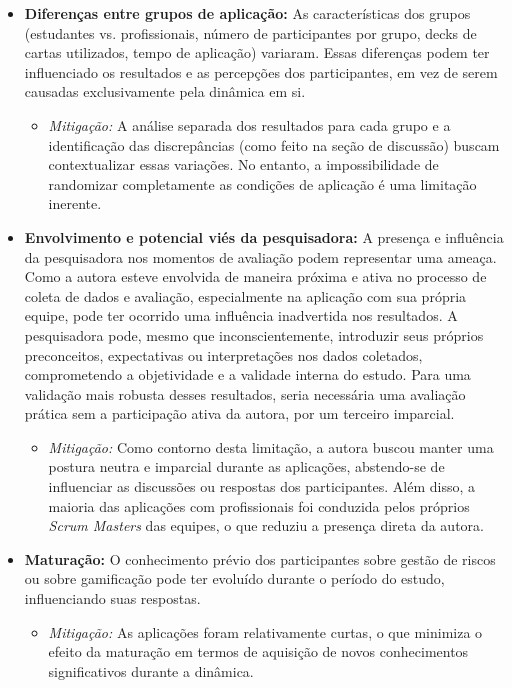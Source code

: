 \documentclass[
	12pt,
	openright,
	twoside,
	a4paper,
	english,
	brazil
	]{abntex2}
\begin{document}
\begin{itemize}
  \item \textbf{Diferenças entre grupos de aplicação:} As características dos grupos (estudantes vs. profissionais, número de participantes por grupo, decks de cartas utilizados, tempo de aplicação) variaram. Essas diferenças podem ter influenciado os resultados e as percepções dos participantes, em vez de serem causadas exclusivamente pela dinâmica em si.
  \begin{itemize}
    \item \textit{Mitigação:} A análise separada dos resultados para cada grupo e a identificação das discrepâncias (como feito na seção de discussão) buscam contextualizar essas variações. No entanto, a impossibilidade de randomizar completamente as condições de aplicação é uma limitação inerente.
    \end{itemize}
  \item \textbf{Envolvimento e potencial viés da pesquisadora:} A presença e influência da pesquisadora nos momentos de avaliação podem representar uma ameaça. Como a autora esteve envolvida de maneira próxima e ativa no processo de coleta de dados e avaliação, especialmente na aplicação com sua própria equipe, pode ter ocorrido uma influência inadvertida nos resultados. A pesquisadora pode, mesmo que inconscientemente, introduzir seus próprios preconceitos, expectativas ou interpretações nos dados coletados, comprometendo a objetividade e a validade interna do estudo. Para uma validação mais robusta desses resultados, seria necessária uma avaliação prática sem a participação ativa da autora, por um terceiro imparcial.
  \begin{itemize}
    \item \textit{Mitigação:} Como contorno desta limitação, a autora buscou manter uma postura neutra e imparcial durante as aplicações, abstendo-se de influenciar as discussões ou respostas dos participantes. Além disso, a maioria das aplicações com profissionais foi conduzida pelos próprios \textit{Scrum Masters} das equipes, o que reduziu a presença direta da autora.
    \end{itemize}
  \item \textbf{Maturação:} O conhecimento prévio dos participantes sobre gestão de riscos ou sobre gamificação pode ter evoluído durante o período do estudo, influenciando suas respostas.
    \begin{itemize}
    \item \textit{Mitigação:} As aplicações foram relativamente curtas, o que minimiza o efeito da maturação em termos de aquisição de novos conhecimentos significativos durante a dinâmica.

\end{itemize}
\end{itemize}
\end{document}
